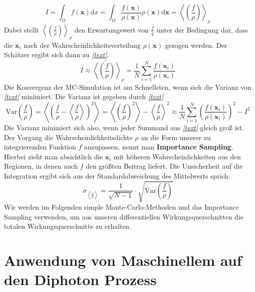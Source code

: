 \begin{equation}
I = \int_{\Omega} f(\mathbf{x}) \text{d}x =  \int_{\Omega} \frac{f(\mathbf{x})}{\rho(\mathbf{x})}\rho(\mathbf{x}) \text{d}\mathbf{x} = \left\langle \left(\frac{f}{\rho}\right) \right\rangle_{\rho} 
\end{equation}
Dabei stellt $\left\langle \left(\frac{f}{\rho}\right) \right\rangle_{\rho}$  den Erwartungswert von $\frac{f}{q}$ unter der Bedingung dar, dass die $\mathbf{x}_i$ nach der Wahrscheinlichkeitsverteilung $\rho(\mathbf{x})$ gezogen werden. Der Schätzer ergibt sich dann zu \textit{\autoref{text}}.
\begin{equation}
I \approx \tilde{\left\langle \left(\frac{f}{\rho}\right) \right\rangle}_{\rho}  = \frac{1}{N}\sum_{i=1}^{N}\frac{f(\mathbf{x}_i)}{\rho(\mathbf{x}_i)}
\end{equation}
Die Konvergenz der MC-Simulation ist am Schnellsten, wenn sich die Varianz von \textit{\autoref{text}} minimiert. Die Varianz ist gegeben durch \textit{\autoref{text}}
\begin{equation}
\text{Var}\left(\frac{f}{\rho}\right) = \left\langle\left(\frac{f}{\rho} - \left\langle \frac{f}{\rho}\right\rangle \right)^2 \right\rangle = \left\langle \left(\frac{f}{\rho}\right)^2 \right\rangle - \left\langle\frac{f}{\rho} \right\rangle^2 \approx \frac{1}{N} \sum_{i=1}^{N}\left(\frac{f(\mathbf{x}_i)}{\rho(\mathbf{x}_i)}\right)^2 - I^2
\end{equation}
Die Varianz minimiert sich also, wenn jeder Summand aus \textit{\autoref{text}} gleich groß ist. Der Vorgang die Wahrscheinlichkeitsdichte $\rho$ an die Form unserer zu integrierenden Funktion $f$ anzupassen, nennt man \textbf{Importance Sampling}. Hierbei zieht man absichtlich die $\mathbf{x}_i$ mit höheren Wahrscheinlichkeiten aus den Regionen, in denen auch $f$ den größten Beitrag liefert. Die Unsicherheit auf die Integration ergibt sich aus der Standardabweichung des Mittelwerts sprich:
\begin{equation}
	\sigma_{\left\langle \frac{f}{\rho}\right\rangle} = \frac{1}{\sqrt{N-1}} \cdot \sqrt{\text{Var}\left(\frac{f}{\rho}\right)}
\end{equation}
Wir werden im Folgenden simple Monte-Carlo-Methoden und das Importance Sampling verwenden, um aus unseren differentiellen Wirkungsquerschnitten die totalen Wirkungsquerschnitte zu erhalten.   


\chapter{Anwendung von Maschinellem auf den Diphoton Prozess}
